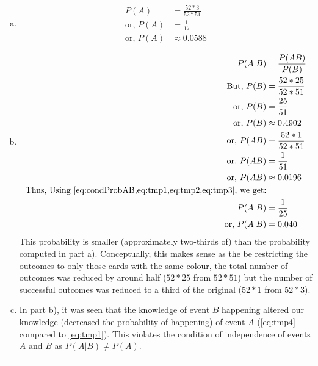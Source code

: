 \begin{enumerate}[a.]
	\item
	\begin{align}
		P(A) &= \frac{52*3}{52*51} \nonumber\\
		\text{or, } P(A) &= \frac{1}{17} \nonumber\\
		\text{or, } P(A) &\approx 0.0588 \label{eq:tmp1}
	\end{align}
	\item
	\begin{align}
		P(A|B) &= \frac{P(AB)}{P(B)} \label{eq:condProbAB}\\
		\text{But, } P(B) &= \frac{52*25}{52*51} \nonumber\\
		\text{or, } P(B) &= \frac{25}{51} \nonumber\\
		\text{or, } P(B) &\approx 0.4902 \label{eq:tmp2}\\
		\text{or, } P(AB) &= \frac{52*1}{52*51} \nonumber\\
		\text{or, } P(AB) &= \frac{1}{51} \nonumber \\
		\text{or, } P(AB) &\approx 0.0196 \label{eq:tmp3}\\
		\text{Thus, Using \cref{eq:condProbAB,eq:tmp1,eq:tmp2,eq:tmp3}, we get:} & {} \nonumber\\
		\text{} P(A|B) &= \frac{1}{25} \nonumber\\
		\text{or, } P(A|B) &= 0.040 \label{eq:tmp4}
	\end{align}
	This probability is smaller (approximately two-thirds of) than the probability computed in part a). Conceptually, this makes sense as the be restricting the outcomes to only those cards with the same colour, the total number of outcomes was reduced by around half ($52*25$ from $52*51$) but the number of successful outcomes was reduced to a third of the original ($52*1$ from $52*3$). 

	\item In part b), it was seen that the knowledge of event $B$ happening altered our knowledge (decreased the probability of happening) of event $A$ (\cref{eq:tmp4} compared to \cref{eq:tmp1}). This violates the condition of independence of events $A$ and $B$ as $P(A|B) \neq P(A)$. 
\end{enumerate}
\noindent\rule{\textwidth}{1pt}
\newpage